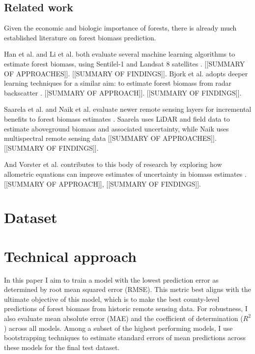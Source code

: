 \documentclass{article}
\begin{document}
\subsection{Related work}

Given the economic and biologic importance of forests, there is already much established literature on forest biomass prediction. 

Han et al. and Li et al. both evaluate several machine learning algorithms to estimate forest biomass, using Sentilel-1 and Landsat 8 satellites \cite{Han_2022, Li_2020}. [[SUMMARY OF APPROACHES]]. [[SUMMARY OF FINDINGS]]. Bjork et al. adopts deeper learning techniques for a similar aim: to estimate forest biomass from radar backscatter \cite{Bjork_2021}. [[SUMMARY OF APPROACH]]. [[SUMMARY OF FINDINGS]].

Saarela et al. and Naik et al. evaluate newer remote sensing layers for incremental benefits to forest biomass estimates \cite{Saarela_2020, Naik_2021}. Saarela uses LiDAR and field data to estimate aboveground biomass and associated uncertainty, while Naik uses multispectral remote sensing data [[SUMMARY OF APPROACHES]]. [[SUMMARY OF FINDINGS]].

And Vorster et al. contributes to this body of research by exploring how allometric equations can improve estimates of uncertainty in biomass estimates \cite{Vorster_2020}. [[SUMMARY OF APPROACH]], [[SUMMARY OF FINDINGS]].


\section{Dataset}



\section{Technical approach}

In this paper I aim to train a model with the lowest prediction error as determined by root mean squared error (RMSE). This metric best aligns with the ultimate objective of this model, which is to make the best county-level predictions of forest biomass from historic remote sensing data. For robustness, I also evaluate mean absolute error (MAE) and the coefficient of determination ($R^2$) across all models. Among a subset of the highest performing models, I use bootstrapping techniques to estimate standard errors of mean predictions across these models for the final test dataset. 
\end{document}
